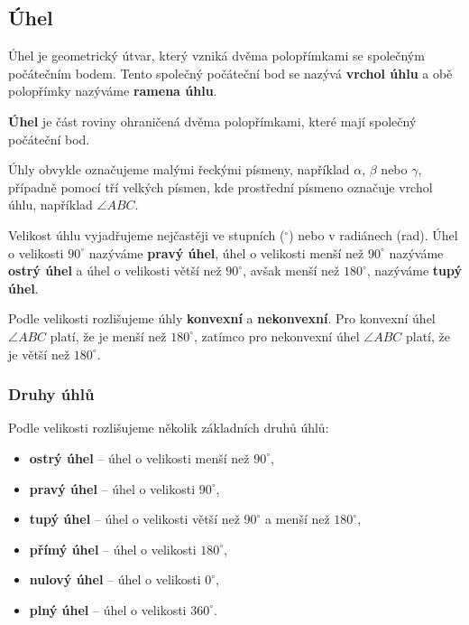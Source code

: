 \documentclass[12pt,a4paper]{article}
\begin{document}
\subsection{Úhel}

Úhel je geometrický útvar, který vzniká dvěma polopřímkami se společným počátečním bodem.
Tento společný počáteční bod se nazývá \textbf{vrchol úhlu}
a obě polopřímky nazýváme \textbf{ramena úhlu}.

\begin{definitionbox}
    \textbf{Úhel} je část roviny ohraničená dvěma polopřímkami, které mají společný počáteční bod.
\end{definitionbox}

Úhly obvykle označujeme malými řeckými písmeny, například \(\alpha\), \(\beta\) nebo \(\gamma\),
případně pomocí tří velkých písmen, kde prostřední písmeno označuje vrchol úhlu,
například \(\angle ABC\).

Velikost úhlu vyjadřujeme nejčastěji ve stupních (\(^{\circ}\)) nebo v radiánech (rad).
Úhel o velikosti \(90^\circ\) nazýváme \textbf{pravý úhel},
úhel o velikosti menší než \(90^\circ\) nazýváme \textbf{ostrý úhel}
a úhel o velikosti větší než \(90^\circ\), avšak menší než \(180^\circ\), nazýváme \textbf{tupý úhel}.

\begin{center}
\end{center}

Podle velikosti rozlišujeme úhly \textbf{konvexní} a \textbf{nekonvexní}.
Pro konvexní úhel \(\angle ABC\) platí, že je menší než \(180^\circ\),
zatímco pro nekonvexní úhel \(\angle ABC\) platí, že je větší než \(180^\circ\).

\subsubsection*{Druhy úhlů}

Podle velikosti rozlišujeme několik základních druhů úhlů:
\begin{itemize}
    \item \textbf{ostrý úhel} -- úhel o velikosti menší než \(90^\circ\),
    \item \textbf{pravý úhel} -- úhel o velikosti \(90^\circ\),
    \item \textbf{tupý úhel} -- úhel o velikosti větší než \(90^\circ\) a menší než \(180^\circ\),
    \item \textbf{přímý úhel} -- úhel o velikosti \(180^\circ\),
    \item \textbf{nulový úhel} -- úhel o velikosti \(0^\circ\),
    \item \textbf{plný úhel} -- úhel o velikosti \(360^\circ\).
\end{itemize}
\end{document}
